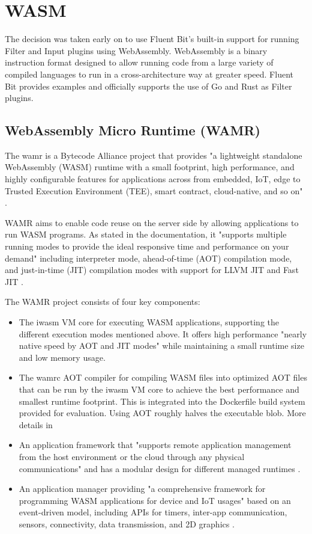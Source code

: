 \section{WASM}
The decision was taken early on to use Fluent Bit's built-in support for running Filter and Input plugins using WebAssembly. WebAssembly is a binary instruction format designed to allow running code from a large variety of compiled languages to run in a cross-architecture way at greater speed.\cite{Webassembly} Fluent Bit provides examples and officially supports the use of Go and Rust as Filter plugins.  
\subsection{WebAssembly Micro Runtime (WAMR)}
The \acrfull{wamr}\cite{wamr-about} is a Bytecode Alliance project that provides "a lightweight standalone WebAssembly (WASM) runtime with a small footprint, high performance, and highly configurable features for applications across from embedded, IoT, edge to Trusted Execution Environment (TEE), smart contract, cloud-native, and so on" \cite{wamr-docs}.

WAMR aims to enable code reuse on the server side by allowing applications to run WASM programs. As stated in the documentation, it "supports multiple running modes to provide the ideal responsive time and performance on your demand" including interpreter mode, ahead-of-time (AOT) compilation mode, and just-in-time (JIT) compilation modes with support for LLVM JIT and Fast JIT \cite{wamr-docs}.

The WAMR project consists of four key components:

\begin{itemize}
\item The iwasm VM core for executing WASM applications, supporting the different execution modes mentioned above. It offers high performance "nearly native speed by AOT and JIT modes" \cite{wamr-docs} while maintaining a small runtime size and low memory usage.

\item The wamrc AOT compiler for compiling WASM files into optimized AOT files that can be run by the iwasm VM core to achieve the best performance and smallest runtime footprint. This is integrated into the Dockerfile build system provided for evaluation. Using AOT roughly halves the executable blob. More details in 

\item An application framework that "supports remote application management from the host environment or the cloud through any physical communications" and has a modular design for different managed runtimes \cite{wamr-docs}.

\item An application manager providing "a comprehensive framework for programming WASM applications for device and IoT usages" based on an event-driven model, including APIs for timers, inter-app communication, sensors, connectivity, data transmission, and 2D graphics \cite{wamr-docs}.

\end{itemize}

